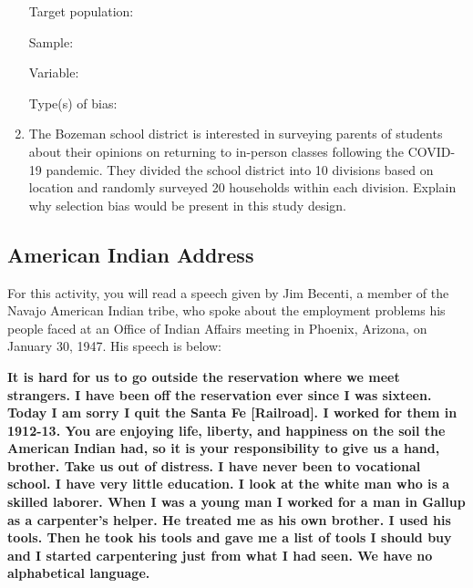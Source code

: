 \documentclass[
]{report}
\begin{document}
\begin{enumerate}
  Target population:
  \vspace{0.3in}

  Sample:
  \vspace{0.3in}

  Variable:
  \vspace{0.3in}

  Type(s) of bias:
  \vspace{0.3in}
\item
  The Bozeman school district is interested in surveying parents of students about their opinions on returning to in-person classes following the COVID-19 pandemic. They divided the school district into 10 divisions based on location and randomly surveyed 20 households within each division. Explain why selection bias would be present in this study design.
  \vspace{1in}
\end{enumerate}

\newpage

\hypertarget{american-indian-address}{%
\subsection{American Indian Address}\label{american-indian-address}}

For this activity, you will read a speech given by Jim Becenti, a member of the Navajo American Indian tribe, who spoke about the employment problems his people faced at an Office of Indian Affairs meeting in Phoenix, Arizona, on January 30, 1947. His speech is below:

\textbf{It is hard for us to go outside the reservation where we meet strangers. I have been off the reservation ever since I was sixteen. Today I am sorry I quit the Santa Fe {[}Railroad{]}. I worked for them in 1912-13. You are enjoying life, liberty, and happiness on the soil the American Indian had, so it is your responsibility to give us a hand, brother. Take us out of distress. I have never been to vocational school. I have very little education. I look at the white man who is a skilled laborer. When I was a young man I worked for a man in Gallup as a carpenter's helper. He treated me as his own brother. I used his tools. Then he took his tools and gave me a list of tools I should buy and I started carpentering just from what I had seen. We have no alphabetical language.}
\end{document}
